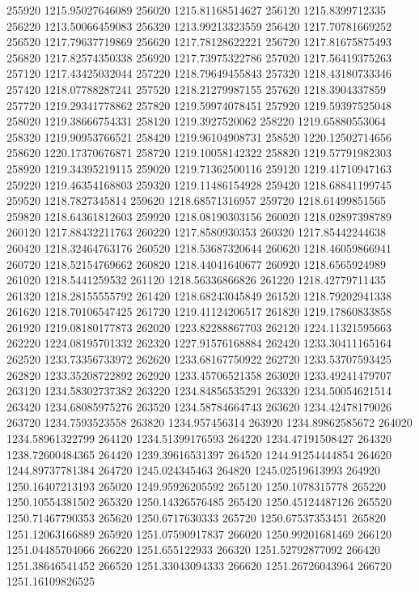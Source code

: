 {255920 1215.95027646089
256020 1215.81168514627
256120 1215.8399712335
256220 1213.50066459083
256320 1213.99213323559
256420 1217.70781669252
256520 1217.79637719869
256620 1217.78128622221
256720 1217.81675875493
256820 1217.82574350338
256920 1217.73975322786
257020 1217.56419375263
257120 1217.43425032044
257220 1218.79649455843
257320 1218.43180733346
257420 1218.07788287241
257520 1218.21279987155
257620 1218.3904337859
257720 1219.29341778862
257820 1219.59974078451
257920 1219.59397525048
258020 1219.38666754331
258120 1219.3927520062
258220 1219.65880553064
258320 1219.90953766521
258420 1219.96104908731
258520 1220.12502714656
258620 1220.17370676871
258720 1219.10058142322
258820 1219.57791982303
258920 1219.34395219115
259020 1219.71362500116
259120 1219.41710947163
259220 1219.46354168803
259320 1219.11486154928
259420 1218.68841199745
259520 1218.7827345814
259620 1218.68571316957
259720 1218.61499851565
259820 1218.64361812603
259920 1218.08190303156
260020 1218.02897398789
260120 1217.88432211763
260220 1217.8580930353
260320 1217.85442244638
260420 1218.32464763176
260520 1218.53687320644
260620 1218.46059866941
260720 1218.52154769662
260820 1218.44041640677
260920 1218.6565924989
261020 1218.5441259532
261120 1218.56336866826
261220 1218.42779711435
261320 1218.28155555792
261420 1218.68243045849
261520 1218.79202941338
261620 1218.70106547425
261720 1219.41124206517
261820 1219.17860833858
261920 1219.08180177873
262020 1223.82288867703
262120 1224.11321595663
262220 1224.08195701332
262320 1227.91576168884
262420 1233.30411165164
262520 1233.73356733972
262620 1233.68167750922
262720 1233.53707593425
262820 1233.35208722892
262920 1233.45706521358
263020 1233.49241479707
263120 1234.58302737382
263220 1234.84856535291
263320 1234.50054621514
263420 1234.68085975276
263520 1234.58784664743
263620 1234.42478179026
263720 1234.7593523558
263820 1234.957456314
263920 1234.89862585672
264020 1234.58961322799
264120 1234.51399176593
264220 1234.47191508427
264320 1238.72600484365
264420 1239.39616531397
264520 1244.91254444854
264620 1244.89737781384
264720 1245.024345463
264820 1245.02519613993
264920 1250.16407213193
265020 1249.95926205592
265120 1250.1078315778
265220 1250.10554381502
265320 1250.14326576485
265420 1250.45124487126
265520 1250.71467790353
265620 1250.6717630333
265720 1250.67537353451
265820 1251.12063166889
265920 1251.07590917837
266020 1250.99201681469
266120 1251.04485704066
266220 1251.655122933
266320 1251.52792877092
266420 1251.38646541452
266520 1251.33043094333
266620 1251.26726043964
266720 1251.16109826525
}
